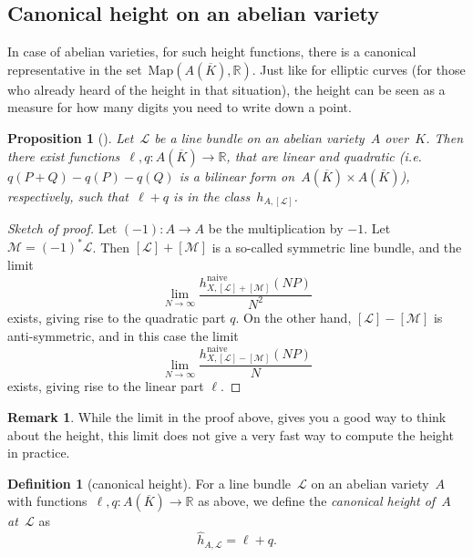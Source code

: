 \documentclass[12pt]{article}
\newtheorem{proposition}[theorem]{Proposition}
\theoremstyle{definition}
\newtheorem{definition}[theorem]{Definition}
\newtheorem{remark}[theorem]{Remark}
\numberwithin{equation}{subsection}
\newcommand{\R}{\ensuremath{\mathbb{R}}}
\begin{document}
\subsection{Canonical height on an abelian variety}

In case of abelian varieties, for such height functions, there is a canonical representative in the set~$\mathrm{Map}(A(\overline{K}), \R)$. Just like for elliptic curves (for those who already heard of the height in that situation), the height can be seen as a measure for how many digits you need to write down a point.

\begin{proposition}[\textrm{\cite[Thm.\ 5, sect.\ II.14, p.\ 300]{Neron}}]
Let~$\mathcal{L}$ be a line bundle on an abelian variety~$A$ over~$K$. Then there exist functions~$\ell, q \colon A(\overline{K}) \rightarrow \R$, that are linear and quadratic (i.e.~$q(P + Q) - q(P) - q(Q)$ is a bilinear form on~$A(\overline{K}) \times A(\overline{K})$), respectively, such that~$\ell+q$ is in the class~$h_{A,[\mathcal{L}]}$.
\end{proposition}

\begin{proof}[Sketch of proof]
Let $(-1) \colon A \to A$ be the multiplication by $-1$. Let $\mathcal{M} = (-1)^*\mathcal{L}$. Then $[\mathcal{L}] + [\mathcal{M}]$ is a so-called symmetric line bundle, and the limit $$\lim_{N \to \infty} \frac{h_{X,[\mathcal{L}] + [\mathcal{M}]}^\textrm{naive}(NP)}{N^2}$$
exists, giving rise to the quadratic part $q$. On the other hand, $[\mathcal{L}] - [\mathcal{M}]$ is anti-symmetric, and in this case the limit $$\lim_{N \to \infty} \frac{h_{X,[\mathcal{L}] - [\mathcal{M}]}^\textrm{naive}(NP)}{N}$$ exists, giving rise to the linear part $\ell$.
\end{proof}

\begin{remark}
While the limit in the proof above, gives you a good way to think about the height, this limit does not give a very fast way to compute the height in practice.
\end{remark}

\begin{definition}[canonical height]
For a line bundle~$\mathcal{L}$ on an abelian variety~$A$ with functions~$\ell, q \colon A(\overline{K}) \rightarrow \R$ as above, we define the {\em canonical height of~$A$ at~$\mathcal{L}$} as~$$\widehat{h}_{A,\mathcal{L}} = \ell + q.$$
\end{definition}
\end{document}
